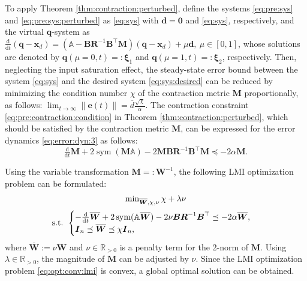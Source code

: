\documentclass{ifacconf}
\newcommand\R{\mathbb{R}}
\newcommand*{\mv}[1]{\boldsymbol{#1}} %
\newcommand*{\mm}[1]{\boldsymbol{#1}} %
\newcommand*{\norm}[1]{\left\lVert #1 \right\rVert} %
\DeclareMathOperator{\mysym}{{sym}}       %
\newcommand\der{\mathrm d}
\newcommand*{\ddtt}{
   \tfrac{\der}{\der t}
}
\begin{document}
To apply Theorem \ref{thm:contraction:perturbed}, define the systems \eqref{eq:pre:sys} and \eqref{eq:pre:sys:perturbed} as \eqref{eq:sys} with $\mv{d}=\mv{0}$ and \eqref{eq:sys}, respectively, and the virtual $\mv{q}$-system as $\ddtt(\mv{q}-\mv{x}_d)=(\mathbb{A}-\mm{B}\mm{R}^{-1}\mv{B}^\top\mm{M})(\mv{q}-\mv{x}_d)+\mu\mv{d},\ \mu\in[0,1]$, whose solutions are denoted by $\mv{q}(\mu=0,t)=:\mv{\xi}_1$ and $\mv{q}(\mu=1,t)=:\mv{\xi}_2$, respectively.
Then, neglecting the input saturation effect, the steady-state error bound between the system \eqref{eq:sys} and the desired system \eqref{eq:sys:desired} can be reduced by minimizing the condition number $\chi$ of the contraction metric $\mm{M}$ proportionally, as follows:
$
   \lim_{t\to\infty}
   \norm{\mv{e}(t)}
   =
   \overline{d}
   \tfrac{\sqrt{\chi}}{\alpha}
$.
The contraction constraint \eqref{eq:pre:contraction:condition} in Theorem \ref{thm:contraction:perturbed}, which should be satisfied by the contraction metric $\mm{M}$, can be expressed for the error dynamics \eqref{eq:error:dyn:3} as follows:
\begin{equation} \label{eq:cstr:ctrc}
   \ddtt\mm{M}
   +
   2\mysym
   \left(
      \mm{M}
      \mathbb{A}
   \right)
   - 
   2
   \mm{M}\mm{B}\mm{R}^{-1}\mm{B}^\top\mm{M}
   \preceq
   -2\alpha \mm{M}
   .
\end{equation}

Using the variable transformation $\mm{M}=:\mm{W}^{-1}$, the following LMI optimization problem can be formulated:
\begin{equation} \label{eq:opt:conv:lmi}
   \begin{matrix}
      \min_{
         \overline{\mm{W}},\chi,\nu
         } 
      \chi + \lambda \nu
      \\ 
      \vspace{-.2cm}
      \\
      \text{s.t. }
      \begin{cases}
         -
         \ddtt\overline{\mm{W}}
         +
         2\mysym(
            \mathbb{A}\overline{\mm{W}}
         )
         -
         2\nu\mm{B}\mm{R}^{-1} \mm{B}^\top 
         \preceq
         -2\alpha\overline{\mm{W}}
         ,
         \\
         \mm{I}_n
         \preceq
         \overline{\mm{W}}
         \preceq
         \chi \mm{I}_n
         ,
      \end{cases}
   \end{matrix}
\end{equation} 
where $\overline{\mm{W}}:=\nu\mm{W}$ and $\nu\in\R_{>0}$ is a penalty term for the 2-norm of $\mm{M}$.
Using $\lambda\in\R_{>0}$, the magnitude of $\mm{M}$ can be adjusted by $\nu$.
Since the LMI optimization problem \eqref{eq:opt:conv:lmi} is convex, a global optimal solution can be obtained.
\end{document}

